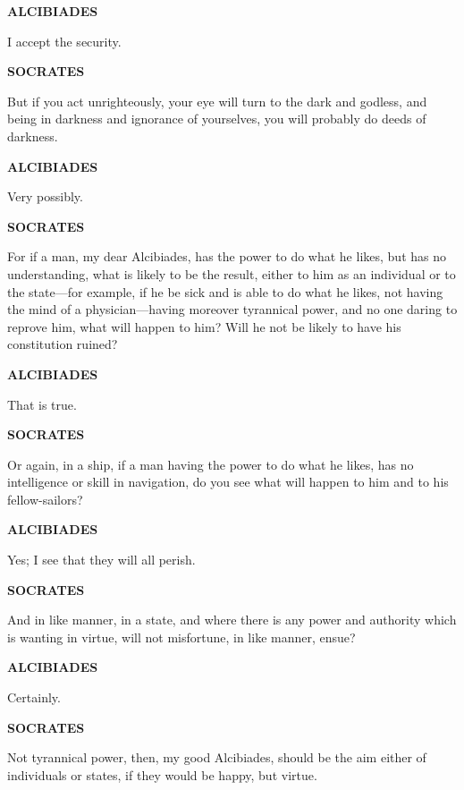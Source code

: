 \documentclass[11pt,letter]{article}
\begin{document}
\par \textbf{ALCIBIADES}
\par   I accept the security.

\par \textbf{SOCRATES}
\par   But if you act unrighteously, your eye will turn to the dark and godless, and being in darkness and ignorance of yourselves, you will probably do deeds of darkness.

\par \textbf{ALCIBIADES}
\par   Very possibly.

\par \textbf{SOCRATES}
\par   For if a man, my dear Alcibiades, has the power to do what he likes, but has no understanding, what is likely to be the result, either to him as an individual or to the state—for example, if he be sick and is able to do what he likes, not having the mind of a physician—having moreover tyrannical power, and no one daring to reprove him, what will happen to him? Will he not be likely to have his constitution ruined?

\par \textbf{ALCIBIADES}
\par   That is true.

\par \textbf{SOCRATES}
\par   Or again, in a ship, if a man having the power to do what he likes, has no intelligence or skill in navigation, do you see what will happen to him and to his fellow-sailors?

\par \textbf{ALCIBIADES}
\par   Yes; I see that they will all perish.

\par \textbf{SOCRATES}
\par   And in like manner, in a state, and where there is any power and authority which is wanting in virtue, will not misfortune, in like manner, ensue?

\par \textbf{ALCIBIADES}
\par   Certainly.

\par \textbf{SOCRATES}
\par   Not tyrannical power, then, my good Alcibiades, should be the aim either of individuals or states, if they would be happy, but virtue.
\end{document}

